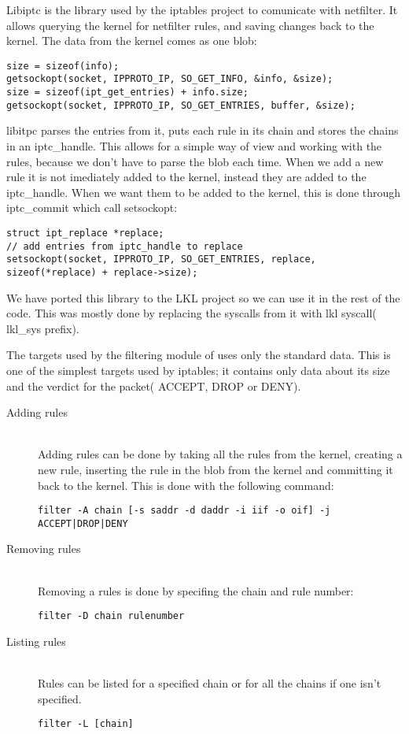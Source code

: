 Libiptc is the library used by the iptables project to comunicate with netfilter. It allows
querying the kernel for netfilter rules, and saving changes back to the kernel. The data from
the kernel comes as one blob:
\lstset{language=C,caption=Getting firewall rules,label=lst:sgetrule}
\begin{lstlisting}
size = sizeof(info);
getsockopt(socket, IPPROTO_IP, SO_GET_INFO, &info, &size); 
size = sizeof(ipt_get_entries) + info.size;
getsockopt(socket, IPPROTO_IP, SO_GET_ENTRIES, buffer, &size);
\end{lstlisting}
libitpc parses the entries from it, puts each rule in its chain and stores the chains in an iptc_handle. This allows for a simple way
of view and working with the rules, because we don't have to parse the blob each time. When we add a new rule
it is not imediately added to the kernel, instead they are added to the iptc_handle. When we want them to be added to the kernel,
this is done through iptc_commit which call setsockopt:
\lstset{language=C,caption=Commiting changes,label=lst:ssetrules}
\begin{lstlisting}
struct ipt_replace *replace;
// add entries from iptc_handle to replace
setsockopt(socket, IPPROTO_IP, SO_GET_ENTRIES, replace, sizeof(*replace) + replace->size);
\end{lstlisting}
We have ported this library to the LKL project so we can use it in the rest of the code. This was mostly done by replacing
the syscalls from it with lkl syscall( lkl_sys prefix).

The targets used by the filtering module of \text{\project} uses only the standard data. This is one of the simplest targets
used by iptables; it contains only data about its size and the verdict for the packet( ACCEPT, DROP or DENY).

\begin{description}
\item[Adding rules] \hfill \\
Adding rules can be done by taking all the rules from the kernel, creating a 
new rule, inserting the rule in the blob from the kernel and committing it back
to the kernel. This is done with the following command:
\lstset{language=zsh,caption=Adding a rule,label=lst:saddrule}
\begin{lstlisting}
filter -A chain [-s saddr -d daddr -i iif -o oif] -j ACCEPT|DROP|DENY
\end{lstlisting}
\item[Removing rules] \hfill \\
Removing a rules is done by specifing the chain and rule number:
\lstset{language=zsh,caption=Deleting a rule,label=lst:sdelrule}
\begin{lstlisting}
filter -D chain rulenumber
\end{lstlisting}
\item[Listing rules] \hfill \\
Rules can be listed for a specified chain or for all the chains if one isn't specified.
\lstset{language=zsh,caption=List rules,label=lst:slstrule}
\begin{lstlisting}
filter -L [chain]
\end{lstlisting}
\end{description}

